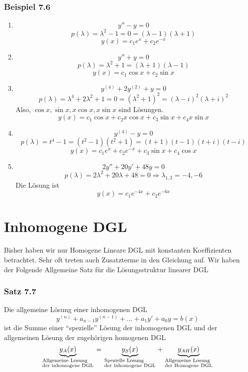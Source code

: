 \subsubsection*{Beispiel 7.6}
\begin{enumerate}
\item \[y''-y=0\]
\[p(\lambda)=\lambda^2-1=0=(\lambda-1)(\lambda+1)\]
\[y(x)=c_1e^x+c_2e^{-x}\]
\item \[y''+y=0\]
\[p(\lambda)=\lambda^2+1=(\lambda+1)(\lambda-1)\]
\[y(x)=c_1\cos x+c_2\sin x\]
\item \[y^{(4)}+2y^{(2)}+y=0\]
\[p(\lambda)=\lambda^4+2\lambda^2+1=0=(\lambda^2+1)^2=(\lambda-i)^2(\lambda+i)^2\]
Also, $\cos x, \sin x, x\cos x,x\sin x$ sind Lösungen. \[y(x)=c_1\cos x+c_2 x\cos x+c_3\sin x+c_4 x\sin x\]
\item \[y^{(4)}-y=0\]
\[p(\lambda)=t^4-1=(t^2-1)(t^2+1)=(t+1)(t-1)(t+i)(t-i)\]
\[y(x)=c_1e^x+c_2e^{-x}+c_3\sin x+c_4\cos x\]
\item \[2y''+20y'+48y=0\]
\[p(\lambda)=2\lambda^2 +20\lambda+48=0\Rightarrow \lambda_{1,2}=-4,-6\] 
Die Lösung ist \[y(x)=c_1e^{-4x}+c_2e^{-6x}\]
\end{enumerate}
\section{Inhomogene DGL}
Bisher haben wir nur Homogene Lineare DGL mit konstanten Koeffizienten betrachtet. Sehr oft treten auch Zusatzterme in den Gleichung auf. Wir haben der Folgende Allgemeine Satz für die Lösungsstruktur linearer DGL
\subsubsection*{Satz 7.7}
Die allgemeine Lösung einer inhomogenen DGL \[y^{(n)}+a_{n-1}y^{(n-1)}+\dots +a_1y'+a_0y=b(x)\] ist die Summe einer ``spezielle'' Lösung der inhomogenen DGL und der allgemeinen Lösung der zugehörigen homogenen DGL $$\underbrace {{y_A}(x)}_{\scriptstyle{\text{Allgemeine Losung }}\hfill\atop
\scriptstyle{\text{der inhomogene DGL}}\hfill} = \underbrace {{y_S}(x)}_{\scriptstyle{\text{Spezielle Losung }}\hfill\atop
\scriptstyle{\text{der inhomogene DGL}}\hfill} + \underbrace {{y_{AH}}(x)}_{\scriptstyle{\text{Allgemeine Losung }}\hfill\atop
\scriptstyle{\text{der Homogene DGL}}\hfill}$$
